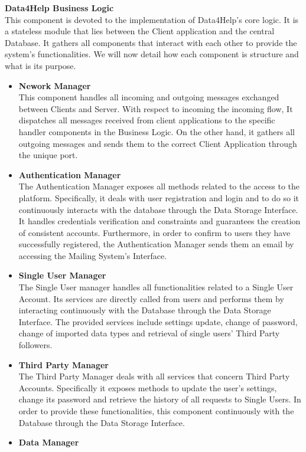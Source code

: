 \documentclass[titlepage]{article}
\begin{document}
{\bf Data4Help Business Logic }\\ 
This component is devoted to the implementation of Data4Help’s core logic. It is a stateless module that lies between the Client application and the central Database. It gathers all components that interact with each other to provide the system’s functionalities. We will now detail how each component is structure and what is its purpose.
\begin{itemize}
        \item {\bf Nework Manager }\\
        This component handles all incoming and outgoing messages exchanged between Clients and Server. With respect to incoming the incoming flow, It dispatches all messages received from client applications to the specific handler components in the Business Logic. On the other hand, it gathers all outgoing messages and sends them to the correct Client Application through the unique port.
		\item {\bf Authentication Manager }\\
		The Authentication Manager exposes all methods related to the access to the platform. Specifically, it deals with user registration and login and to do so it continuously interacts with the database through the Data Storage Interface. It handles credentials verification and constraints and guarantees the creation of consistent accounts. Furthermore, in order to confirm to users they have successfully registered, the Authentication Manager sends them an email by accessing the Mailing System’s Interface.
		\item {\bf Single User Manager }\\
		The Single User manager handles all functionalities related to a Single User Account. Its services are directly called from users and performs them by interacting continuously with the Database through the Data Storage Interface. The provided services include settings update, change of password, change of imported data types and retrieval of single users’ Third Party followers.
		\item {\bf Third Party Manager }\\
		The Third Party Manager deals with all services that concern Third Party Accounts. Specifically it exposes methods to update the user’s settings, change its password and retrieve the history of all requests to Single Users. In order to provide these functionalities, this component continuously with the Database through the Data Storage Interface.
		\item {\bf Data Manager }\\

\end{itemize}
\end{document}
